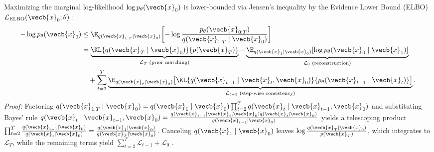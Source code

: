 \documentclass[../../../../master.tex]{subfiles}
\begin{document}
\begin{coremath}
\label{thm:ddpm:elbo}
Maximizing the marginal log-likelihood $\log p_\theta(\vecb{x}_0)$ is lower-bounded via Jensen's inequality by the Evidence Lower Bound (ELBO) $\mathcal{L}_{\mathrm{ELBO}}(\vecb{x}_0; \theta)$  :
\begin{align}
  -\log p_\theta(\vecb{x}_0) &\le \E_{q(\vecb{x}_{1:T} \mid \vecb{x}_0)}\!\left[-\log \frac{p_\theta(\vecb{x}_{0:T})}{q(\vecb{x}_{1:T} \mid \vecb{x}_0)}\right] \nonumber \\
  &= \underbrace{\KL{q(\vecb{x}_T \mid \vecb{x}_0)}{p(\vecb{x}_T)}}_{\mathcal{L}_T \text{ (prior matching)}} - \underbrace{\E_{q(\vecb{x}_1 \mid \vecb{x}_0)}\!\left[\log p_\theta(\vecb{x}_0 \mid \vecb{x}_1)\right]}_{\mathcal{L}_0 \text{ (reconstruction)}} \nonumber \\
  &\quad + \sum_{t=2}^T \underbrace{\E_{q(\vecb{x}_t \mid \vecb{x}_0)}\!\left[\KL{q(\vecb{x}_{t-1} \mid \vecb{x}_t, \vecb{x}_0)}{p_\theta(\vecb{x}_{t-1} \mid \vecb{x}_t)}\right]}_{\mathcal{L}_{t-1} \text{ (step-wise consistency)}}. \label{eq:ddpm:elbo_decomp}
\end{align}
\emph{Proof:} Factoring $q(\vecb{x}_{1:T} \mid \vecb{x}_0) = q(\vecb{x}_1 \mid \vecb{x}_0)\prod_{t=2}^T q(\vecb{x}_t \mid \vecb{x}_{t-1}, \vecb{x}_0)$ and substituting Bayes' rule $q(\vecb{x}_t \mid \vecb{x}_{t-1}, \vecb{x}_0) = \frac{q(\vecb{x}_{t-1} \mid \vecb{x}_t, \vecb{x}_0) q(\vecb{x}_t \mid \vecb{x}_0)}{q(\vecb{x}_{t-1} \mid \vecb{x}_0)}$ yields a telescoping product $\prod_{t=2}^T \frac{q(\vecb{x}_{t-1} \mid \vecb{x}_0)}{q(\vecb{x}_t \mid \vecb{x}_0)} = \frac{q(\vecb{x}_1 \mid \vecb{x}_0)}{q(\vecb{x}_T \mid \vecb{x}_0)}$. Canceling $q(\vecb{x}_1 \mid \vecb{x}_0)$ leaves $\log \frac{q(\vecb{x}_T \mid \vecb{x}_0)}{p(\vecb{x}_T)}$, which integrates to $\mathcal{L}_T$, while the remaining terms yield $\sum_{t=2}^T \mathcal{L}_{t-1} + \mathcal{L}_0$ .


\end{coremath}
\end{document}
